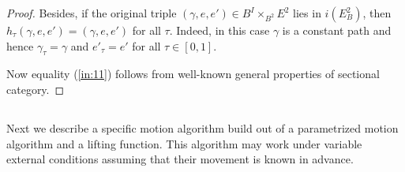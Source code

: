 \documentclass[11pt]{amsart}
\begin{document}
\begin{proof}
Besides, if the original triple $(\gamma, e, e')\in B^I\times_{B^2}E^2$ lies in $i(E^2_B)$, then $h_\tau(\gamma, e, e')=(\gamma, e, e')$ for all $\tau$. 
Indeed, in this case $\gamma$ is a constant path and hence  $\gamma_\tau=\gamma$ and $e'_\tau=e'$ for all $\tau\in [0,1]$. 

Now equality (\ref{in:11}) follows from well-known general properties of sectional category. 
\end{proof}
\subsection{}  Next we describe a specific motion algorithm build out of a parametrized motion algorithm and a lifting function. This algorithm may work under variable external conditions assuming that their movement is known in advance. 
\end{document}

